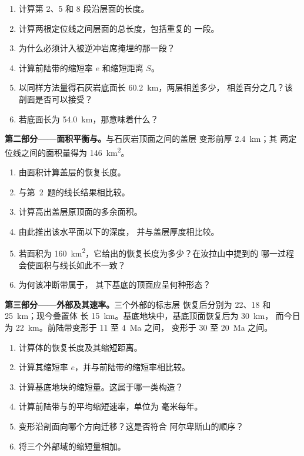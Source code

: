\begin{problem}
\begin{enumerate}
\item 计算第 2、5 和 8 段沿层面的长度。
\item 计算两根定位线之间层面的总长度，包括重复的
一段。
\item 为什么必须计入被逆冲岩席掩埋的那一段？
\item 计算前陆带的缩短率 $e$ 和缩短距离 $S$。
\item 以同样方法量得石灰岩底面长 \qty{60.2}{km}，两层相差多少，
相差百分之几？该剖面是否可以接受？
\item 若底面长为 \qty{54.0}{km}，那意味着什么？
\end{enumerate}

\noindent\textbf{第二部分——面积平衡与。}与石灰岩顶面之间的盖层
变形前厚 \qty{2.4}{km}；其
两定位线之间的面积量得为 \qty{146}{km^2}。
\begin{enumerate}[resume]
\item 由面积计算盖层的恢复长度。
\item 与第~2~题的线长结果相比较。
\item 计算高出盖层原顶面的多余面积。
\item 由此推出该水平面以下的深度，
并与盖层厚度相比较。
\item 若面积为 \qty{160}{km^2}，它给出的恢复长度为多少？在汝拉山中提到的
哪一过程会使面积与线长如此不一致？
\item 为何该冲断带属于，
其下基底的顶面应呈何种形态？
\end{enumerate}

\noindent\textbf{第三部分——外部及其速率。}三个外部的标志层
恢复后分别为 22、18 和 \qty{25}{km}；现今叠置体
长 \qty{15}{km}。基底地块中，基底顶面恢复后为 \qty{30}{km}，
而今日为 \qty{22}{km}。前陆带变形于 11 至 \qty{4}{Ma} 之间，
变形于 30 至 \qty{20}{Ma} 之间。
\begin{enumerate}[resume]
\item 计算体的恢复长度及其缩短距离。
\item 计算其缩短率 $e$，并与前陆带的缩短率相比较。
\item 计算基底地块的缩短量。这属于哪一类构造？
\item 计算前陆带与的平均缩短速率，单位为
毫米每年。
\item 变形沿剖面向哪个方向迁移？这是否符合
阿尔卑斯山的顺序？
\item 将三个外部域的缩短量相加。
\end{enumerate}


\end{problem}
